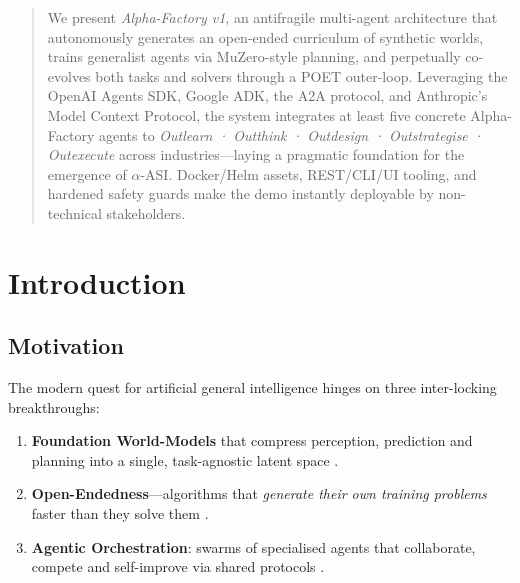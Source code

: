 \begin{abstract}\noindent
We present \emph{Alpha-Factory v1}, an antifragile multi-agent architecture
that autonomously generates an open-ended curriculum of synthetic worlds,
trains generalist agents via MuZero-style planning, and perpetually co-evolves
both tasks and solvers through a POET outer-loop.  Leveraging the OpenAI
Agents SDK, Google ADK, the \textsc{A2A} protocol, and Anthropic’s Model
Context Protocol, the system integrates at least five concrete Alpha-Factory
agents to \emph{Outlearn · Outthink · Outdesign · Outstrategise · Outexecute}
across industries—laying a pragmatic foundation for the emergence of
$\alpha$-ASI.  Docker/Helm assets, REST/CLI/UI tooling, and hardened safety
guards make the demo instantly deployable by non-technical stakeholders.
\end{abstract}

\tableofcontents
\newpage

\section{Introduction}\label{sec:intro}

\subsection{Motivation}

The modern quest for artificial general intelligence hinges on three
inter-locking breakthroughs:

\begin{enumerate}[label=\textbf{P\arabic*}.]
  \item \textbf{Foundation World-Models} that compress perception, prediction
        and planning into a single, task-agnostic latent space
        \parencite{ha2018world,schrittwieser2019muzero,hafner2023dreamer}.
  \item \textbf{Open-Endedness}---algorithms that \emph{generate their own
        training problems} faster than they solve them
        \parencite{wang2019poet,clune2019aiga,ecoffet2021open}.
  \item \textbf{Agentic Orchestration}: swarms of specialised agents that
        collaborate, compete and self-improve via shared protocols
        \parencite{openaiagents2024,googleadk2024,a2a2023}.
\end{enumerate}

